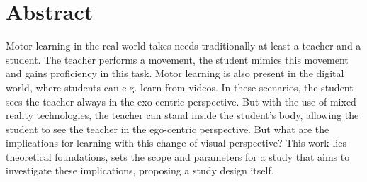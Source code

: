 \chapter*{Abstract}
Motor learning in the real world takes needs traditionally at least a teacher and a student. The teacher performs a movement, the student mimics this movement and gains proficiency in this task. Motor learning is also present in the digital world, where students can e.g. learn from videos. In these scenarios, the student sees the teacher always in the exo-centric perspective. But with the use of mixed reality technologies, the teacher can stand inside the student's body, allowing the student to see the teacher in the ego-centric perspective. But what are the implications for learning with this change of visual perspective? This work lies theoretical foundations, sets the scope and parameters for a study that aims to investigate these implications, proposing a study design itself.


